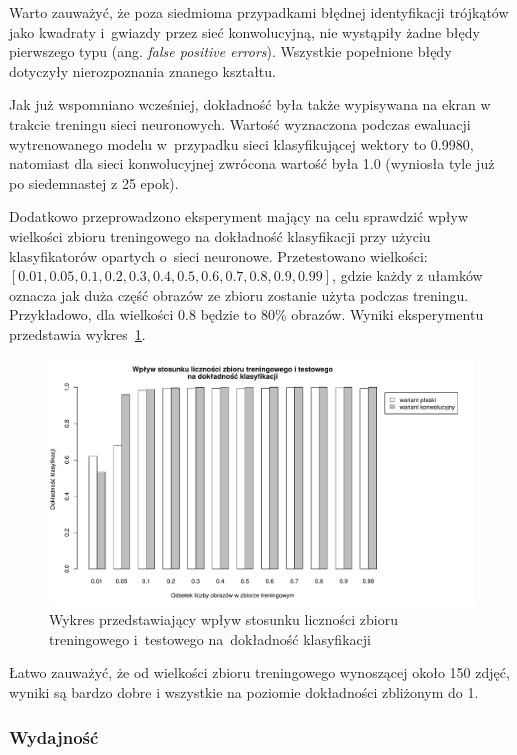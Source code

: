 \documentclass[11pt,a4paper]{article}
\begin{document}
Warto zauważyć, że poza siedmioma przypadkami błędnej identyfikacji trójkątów jako kwadraty i~gwiazdy przez sieć konwolucyjną, nie wystąpiły żadne błędy pierwszego typu (ang. \emph{false positive errors}). Wszystkie popełnione błędy dotyczyły nierozpoznania znanego kształtu.

Jak już wspomniano wcześniej, dokładność była także wypisywana na ekran w trakcie treningu sieci neuronowych. Wartość wyznaczona podczas ewaluacji wytrenowanego modelu w~przypadku sieci klasyfikującej wektory to 0.9980, natomiast dla sieci konwolucyjnej zwrócona wartość była 1.0 (wyniosła tyle już po siedemnastej z 25 epok).

Dodatkowo przeprowadzono eksperyment mający na celu sprawdzić wpływ wielkości zbioru treningowego na dokładność klasyfikacji przy użyciu klasyfikatorów opartych o~sieci neuronowe. Przetestowano wielkości: $[0.01, 0.05, 0.1, 0.2, 0.3, 0.4, 0.5, 0.6, 0.7, 0.8, 0.9, 0.99]$, gdzie każdy z ułamków oznacza jak duża część obrazów ze zbioru \cite{shapes} zostanie użyta podczas treningu. Przykładowo, dla wielkości 0.8 będzie to 80\% obrazów.
Wyniki eksperymentu przedstawia wykres~\ref{fig:test-train-proportions}.

\begin{figure}
    \centering
    \includegraphics[width=\textwidth]{res/img/test-train-proportions.pdf}
    \caption{Wykres przedstawiający wpływ stosunku liczności zbioru treningowego i~testowego na~dokładność klasyfikacji}
    \label{fig:test-train-proportions}
\end{figure}

Łatwo zauważyć, że od wielkości zbioru treningowego wynoszącej około 150 zdjęć, wyniki są bardzo dobre i wszystkie na poziomie dokładności zbliżonym do 1.

\subsubsection{Wydajność}
\end{document}
